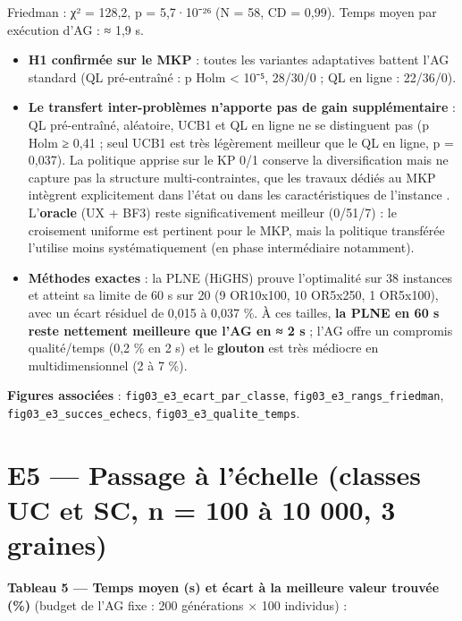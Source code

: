 \documentclass[
  french,
  11pt,
  a4paper,
]{article}
\providecommand{\tightlist}{%
  \setlength{\itemsep}{0pt}\setlength{\parskip}{0pt}}
\begin{document}
Friedman : χ² = 128,2, p = 5,7·10⁻²⁶ (N = 58, CD = 0,99). Temps moyen
par exécution d'AG : ≈ 1,9 s.

\begin{itemize}
\tightlist
\item
  \textbf{H1 confirmée sur le MKP} : toutes les variantes adaptatives
  battent l'AG standard (QL pré-entraîné : p Holm \textless{} 10⁻⁵,
  28/30/0 ; QL en ligne : 22/36/0).
\item
  \textbf{Le transfert inter-problèmes n'apporte pas de gain
  supplémentaire} : QL pré-entraîné, aléatoire, UCB1 et QL en ligne ne
  se distinguent pas (p Holm ≥ 0,41 ; seul UCB1 est très légèrement
  meilleur que le QL en ligne, p = 0,037). La politique apprise sur le
  KP 0/1 conserve la diversification mais ne capture pas la structure
  multi-contraintes, que les travaux dédiés au MKP intègrent
  explicitement dans l'état ou dans les caractéristiques de l'instance
  \autocite{bushaj_k-means_2024,rezoug_application_2022,cacchiani_knapsack_2022}.
  L'\textbf{oracle} (UX + BF3) reste significativement meilleur (0/51/7)
  : le croisement uniforme est pertinent pour le MKP, mais la politique
  transférée l'utilise moins systématiquement (en phase intermédiaire
  notamment).
\item
  \textbf{Méthodes exactes} : la PLNE (HiGHS) prouve l'optimalité sur 38
  instances et atteint sa limite de 60 s sur 20 (9 OR10x100, 10 OR5x250,
  1 OR5x100), avec un écart résiduel de 0,015 à 0,037 \%. À ces tailles,
  \textbf{la PLNE en 60 s reste nettement meilleure que l'AG en ≈ 2 s} ;
  l'AG offre un compromis qualité/temps (0,2 \% en 2 s) et le
  \textbf{glouton} est très médiocre en multidimensionnel (2 à 7 \%).
\end{itemize}

\textbf{Figures associées} : \texttt{fig03\_e3\_ecart\_par\_classe},
\texttt{fig03\_e3\_rangs\_friedman}, \texttt{fig03\_e3\_succes\_echecs},
\texttt{fig03\_e3\_qualite\_temps}.

\section{E5 --- Passage à l'échelle (classes UC et SC, n = 100 à 10 000,
3
graines)}\label{analyse_resultats-e5-passage-uxe0-luxe9chelle-classes-uc-et-sc-n-100-uxe0-10-000-3-graines}

\textbf{Tableau 5 --- Temps moyen (s) et écart à la meilleure valeur
trouvée (\%)} (budget de l'AG fixe : 200 générations × 100 individus) :
\end{document}

